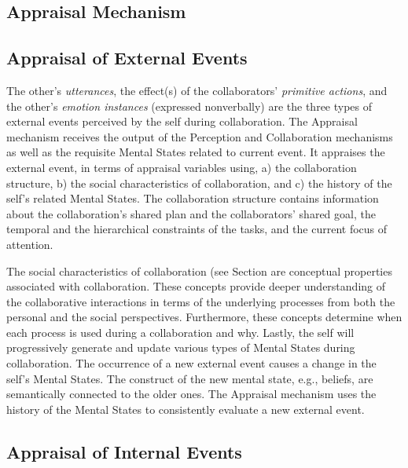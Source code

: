 \documentclass[letterpaper]{article}
\begin{document}
\subsection{Appraisal Mechanism}

\subsection{Appraisal of External Events}

The other's \textit{utterances}, the effect(s) of the collaborators'
\textit{primitive actions}, and the other's \textit{emotion instances}
(expressed nonverbally) are the three types of external events perceived by the
self during collaboration. The Appraisal mechanism receives the output of the
Perception and Collaboration mechanisms as well as the requisite Mental States
related to current event. It appraises the external event, in terms of appraisal
variables using, a) the collaboration structure, b) the social characteristics
of collaboration, and c) the history of the self's related Mental States. The
collaboration structure contains information about the collaboration's shared
plan and the collaborators' shared goal, the temporal and the hierarchical
constraints of the tasks, and the current focus of attention. 

The social characteristics of collaboration (see Section are conceptual
properties associated with collaboration. These concepts provide deeper
understanding of the collaborative interactions in terms of the underlying
processes from both the personal and the social perspectives. Furthermore, these
concepts determine when each process is used during a collaboration and why.
Lastly, the self will progressively generate and update various types of Mental
States during collaboration. The occurrence of a new external event causes a
change in the self's Mental States. The construct of the new mental state, e.g.,
beliefs, are semantically connected to the older ones. The Appraisal mechanism
uses the history of the Mental States to consistently evaluate a new external
event.

\subsection{Appraisal of Internal Events}
\end{document}
